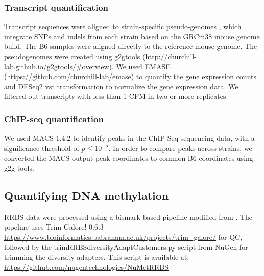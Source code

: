\documentclass[
  11pt,
]{article}
\providecommand{\DIFaddtex}[1]{{\protect\color{blue}\uwave{#1}}} %
\providecommand{\DIFdeltex}[1]{{\protect\color{red}\sout{#1}}}                      %
\providecommand{\DIFaddbegin}{} %
\providecommand{\DIFaddend}{} %
\providecommand{\DIFdelbegin}{} %
\providecommand{\DIFdelend}{} %
\providecommand{\DIFadd}[1]{\texorpdfstring{\DIFaddtex{#1}}{#1}} %
\providecommand{\DIFdel}[1]{\texorpdfstring{\DIFdeltex{#1}}{}} %
\newcommand{\DIFscaledelfig}{0.5}
\newlength{\DIFdelgraphicswidth} %
\newlength{\DIFdelgraphicsheight} %
\newcommand{\DIFaddincludegraphics}[2][]{{\color{blue}\fbox{\DIFOincludegraphics[#1]{#2}}}} %
\newcommand{\DIFdelincludegraphics}[2][]{%
\sbox{\DIFdelgraphicsbox}{\DIFOincludegraphics[#1]{#2}}%
\settoboxwidth{\DIFdelgraphicswidth}{\DIFdelgraphicsbox} %
\settoboxtotalheight{\DIFdelgraphicsheight}{\DIFdelgraphicsbox} %
\scalebox{\DIFscaledelfig}{%
\parbox[b]{\DIFdelgraphicswidth}{\usebox{\DIFdelgraphicsbox}\\[-\baselineskip] \rule{\DIFdelgraphicswidth}{0em}}\llap{\resizebox{\DIFdelgraphicswidth}{\DIFdelgraphicsheight}{%
\setlength{\unitlength}{\DIFdelgraphicswidth}%
\begin{picture}(1,1)%
\thicklines\linethickness{2pt} %
{\color[rgb]{1,0,0}\put(0,0){\framebox(1,1){}}}%
{\color[rgb]{1,0,0}\put(0,0){\line( 1,1){1}}}%
{\color[rgb]{1,0,0}\put(0,1){\line(1,-1){1}}}%
\end{picture}%
}\hspace*{3pt}}} %
} %
\DeclareRobustCommand{\DIFaddbegin}{\DIFOaddbegin \let\includegraphics\DIFaddincludegraphics} %
\DeclareRobustCommand{\DIFaddend}{\DIFOaddend \let\includegraphics\DIFOincludegraphics} %
\DeclareRobustCommand{\DIFdelbegin}{\DIFOdelbegin \let\includegraphics\DIFdelincludegraphics} %
\DeclareRobustCommand{\DIFdelend}{\DIFOaddend \let\includegraphics\DIFOincludegraphics} %
\begin{document}
\hypertarget{transcript-quantification}{%
\subsubsection{Transcript
quantification}\label{transcript-quantification}}

Transcript sequences were aligned to strain-specific pseudo-genomes
\citep{pmid27309819}, which integrate SNPs and indels from each strain
based on the GRCm38 mouse genome build. The B6 samples were aligned
directly to the reference mouse genome. The pseudogenomes were created
using g2gtools
(\url{http://churchill-lab.github.io/g2gtools/#overview}). We used EMASE
(\url{https://github.com/churchill-lab/emase}) \citep{pmid29444201} to
quantify the gene expression counts and DESeq2 vst transformation
\citep{love2014moderated} to normalize the gene expression data. We
filtered out transcripts with less than 1 CPM in two or more replicates.

\DIFdelbegin %
\DIFdelend \DIFaddbegin \hypertarget{chip-seq-quantification}{%
\subsubsection{ChIP-seq quantification}\label{chip-seq-quantification}}
\DIFaddend 

We used MACS 1.4.2 \citep{pmid18798982} to identify peaks in the
\DIFdelbegin \DIFdel{ChIP-Seq }\DIFdelend \DIFaddbegin \DIFadd{ChIP-seq }\DIFaddend sequencing data, with a significance threshold of
\(p \leq 10^{-5}\). In order to compare peaks across strains, we
converted the MACS output peak coordinates to common B6 coordinates
using g2g tools.

\hypertarget{quantifying-dna-methylation}{%
\subsection{Quantifying DNA
methylation}\label{quantifying-dna-methylation}}

RRBS data were processed using a \DIFdelbegin \DIFdel{bismark-based }\DIFdelend \DIFaddbegin \DIFadd{Bismark-based }\DIFaddend pipeline modified from
\citep{pmid30348905}. The pipeline uses Trim Galore! 0.6.3
\url{https://www.bioinformatics.babraham.ac.uk/projects/trim_galore/}
for QC, followed by the trimRRBSdiversityAdaptCustomers.py script from
NuGen for trimming the diversity adapters. This script is available at:
\url{https://github.com/nugentechnologies/NuMetRRBS}
\end{document}
